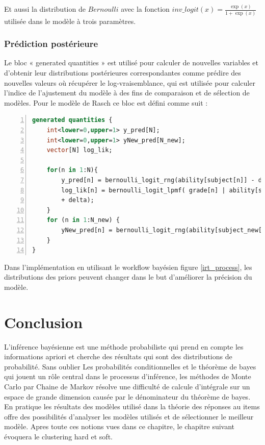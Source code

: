 \noindent Et aussi la distribution de \(\displaystyle Bernoulli \) avec la fonction \(\displaystyle inv\_logit(x) = \frac{\exp(x)}{1+ \exp(x)}  \) utilisée dans le modèle à trois paramètres.
\subsubsection{Prédiction postérieure}
Le bloc « generated quantities » est utilisé pour calculer de nouvelles variables et d'obtenir leur distributions postérieures correspondantes comme prédire des nouvelles valeurs où récupérer le log-vraisemblance, qui est utilisée pour calculer l’indice de l'ajustement du modèle à des fins de comparaison et de sélection de modèles. Pour le modèle de Rasch ce bloc est défini comme suit :

\begin{lstlisting}[language=Stan,label={generated_quantities},basicstyle=\scriptsize, frame=l,framesep=4.5mm,framexleftmargin=2.5mm,tabsize=2,numbers=left,fillcolor=\color{blueforest!70},rulecolor=\color{blueforest},numberstyle=\normalfont\tiny\color{white}]
generated quantities {
	int<lower=0,upper=1> y_pred[N];
	int<lower=0,upper=1> yNew_pred[N_new];
	vector[N] log_lik;

	for(n in 1:N){
		y_pred[n] = bernoulli_logit_rng(ability[subject[n]] - difficulty[item[n]] + delta);
		log_lik[n] = bernoulli_logit_lpmf( grade[n] | ability[subject[n]] - difficulty[item[n]]
		+ delta);
	}
	for (n in 1:N_new) {
		yNew_pred[n] = bernoulli_logit_rng(ability[subject_new[n]] - difficulty[item_new[n]] + delta);                                             
	}
}
\end{lstlisting}
Dans l’implémentation en utilisant le workflow bayésien figure \ref{irt_process}, les distributions des priors peuvent changer dans le but d’améliorer la précision du modèle.
\section{Conclusion}
L’inférence bayésienne est une méthode probabiliste qui prend en compte les informations apriori et cherche des résultats qui sont des distributions de probabilité. Sans oublier Les probabilités conditionnelles et le théorème de bayes qui jouent un rôle central dans le processus d’inférence, les méthodes de Monte Carlo par Chaine de Markov résolve une difficulté de calcule d’intégrale sur un espace de grande dimension causée par le dénominateur du théorème de bayes. En pratique les résultats des modèles utilisé dans la théorie des réponses au items offre des possibilités d’analyser les modèles utilisés et de sélectionner le meilleur modèle. Apres toute ces notions vues dans ce chapitre, le chapitre suivant évoquera le clustering hard et soft.

